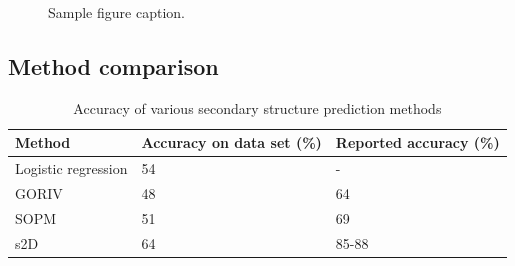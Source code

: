 \documentclass{article}
\begin{document}
\begin{figure}[h]
  \centering
  \caption{Sample figure caption.}
\end{figure}



\subsection{Method comparison}


\begin{table}[t]
  \caption{Accuracy of various secondary structure prediction methods}
  \centering
  \begin{tabular}{lll}
    \toprule
    Method     & Accuracy on data set (\%)    & Reported accuracy (\%)\\
    \midrule
    Logistic regression & 54 & -     \\
    GORIV     & 48 & 64      \\
    SOPM     & 51      & 69  \\
    s2D     & 64       & 85-88  \\
    \bottomrule
  \end{tabular}
\end{table}
\end{document}
